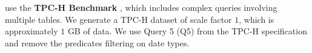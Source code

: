  use the {\bf TPC-H Benchmark}%
, which includes complex queries involving multiple tables. We generate a TPC-H dataset of scale factor $1$, which is approximately $1$ GB of data. We use Query 5 (Q5) from the TPC-H specification and remove the predicates filtering on date types. 

